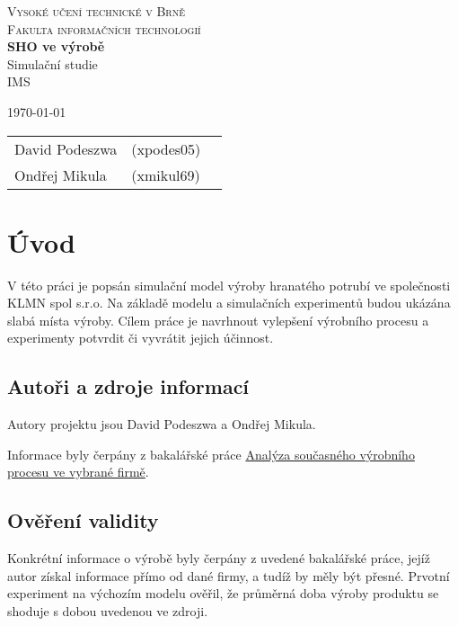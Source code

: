 \documentclass[11pt, a4paper]{article}
\begin{document}
\begin{titlepage}
\begin{center}
\Huge
\textsc{Vysoké učení technické v Brně}\\
\huge
\textsc{Fakulta informačních technologií}\\
\LARGE
{\bf SHO ve výrobě}\\Simulační studie\\IMS
{}
\end{center}
\Large
\today\hfill
\begin{tabular}{l l l}
		David Podeszwa & (xpodes05)\\
		Ondřej Mikula & (xmikul69)\\
\end{tabular}
\end{titlepage}

\newpage
\tableofcontents
\newpage


\section{Úvod}
V této práci je popsán simulační model výroby hranatého potrubí ve společnosti KLMN spol s.r.o. Na základě modelu a simulačních experimentů budou ukázána slabá místa výroby. Cílem práce je  navrhnout vylepšení výrobního procesu a
experimenty potvrdit či vyvrátit jejich účinnost.
\subsection{Autoři a zdroje informací}
Autory projektu jsou David Podeszwa a Ondřej Mikula.


Informace byly čerpány z bakalářské práce \href{http://digilib.k.utb.cz/bitstream/handle/10563/22155/%20ih%C3%A1k_2012_bp.pdf?sequence=1}{Analýza současného výrobního procesu ve
vybrané firmě}\cite{bp}.
\subsection{Ověření validity}
Konkrétní informace o výrobě byly čerpány z uvedené bakalářské práce, jejíž autor získal informace přímo od dané firmy, a tudíž by měly být přesné. Prvotní experiment na výchozím modelu ověřil, že průměrná doba výroby produktu se shoduje s dobou uvedenou ve zdroji.
\end{document}

